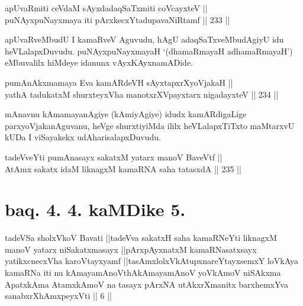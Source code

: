 
\begin{shl}
apUvaRmiti ceVdaM sAyxdadaqSaTxmiti coVcayxteV || \\
puNAyxpuNayxmaya iti pArxkecxYtadupavaNiRtamf \hfill || 233 ||  
\end{shl}

\begin{artha}
apUvaRveMbudU I kamaRveV Aguvudu, hAgU adaqSaTxveMbudAgiyU idu
heVLalapxDuvudu. puNAyxpuNayxmayaH `(dhamaRmayaH adhamaRmayaH')
eMbuvalilx hiMdeye idanunx vAyxKAyxnamADide.
\end{artha}


\begin{shl}
pumAnAkxmamaya Eva kamARdeVH sAyxtapxrXyoVjakaH || \\
yathA tadukatxM shurxteyxVha manotxrXV\s payxtarx nigadayxteV \hfill || 234 ||  
\end{shl}

\begin{artha}
mAnavnu kAmamayanAgiye (kAmiyAgiye) idudx kamARdigaLige
parxyoVjakanAguvanu, heVge shurxtiyiMda ililx heVLalapxTiTxto
maMtarxvU kUDa I viSayakekx udAharisalapxDuvudu.
\end{artha}


\begin{shl}
tadeVveYti pumAnasayx sakatxM yatarx manoV BaveVtf || \\
AtAmx sakatx idaM liknagxM kamaRNA saha tatasxdA \hfill || 235 ||  
\end{shl}

\section*{baq. 4. 4. kaMDike 5.}

\begin{shl}
tadeVSa sholxVkoV Bavati ||tadeVva sakatxH saha kamaRNeYti liknagxM manoV yatarx niSakatxmasayx ||pArxpAyxnatxM kamaRNasatxsayx yatikxcnecxVha karoVtayxyamf ||tasAmxlolxVkAtupxnareYtayxsemxY loVkAya kamaRNa iti nu kAmayamAnoV\s thAkAmayamAnoV yoV\s kAmoV niSAkxma ApatxkAma AtamxkAmoV na tasayx pArxNA utAkxrXmanitx barxhemxYva sanabxrXhAmxpeyxVti || 6 ||
\end{shl}

